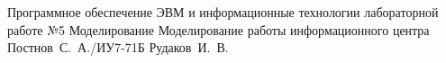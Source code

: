 \documentclass{bmstu}
\begin{document}
	
	{Программное обеспечение ЭВМ и информационные технологии}
	{лабораторной работе №5}
	{Моделирование}
	{Моделирование работы информационного центра}
	{}
	{Постнов~С.~А./ИУ7-71Б}
	{Рудаков~И.~В.}
	
	\maketableofcontents
	
	
	
	
	
\end{document}
